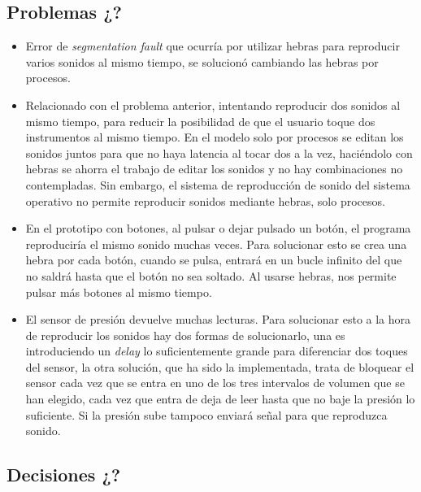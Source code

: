 \documentclass{article}
\begin{document}
 \subsection{Problemas ¿?}
 \begin{itemize}
     \item
        Error de \textit{segmentation fault} que ocurría por utilizar hebras para reproducir
        varios sonidos al mismo tiempo, se solucionó cambiando las hebras por procesos.
     \item
        Relacionado con el problema anterior, intentando reproducir dos sonidos al mismo tiempo, para reducir
        la posibilidad de que el usuario toque dos instrumentos al mismo tiempo. En el modelo solo por procesos
        se editan los sonidos juntos para que no haya latencia al tocar dos a la vez, haciéndolo con hebras se
        ahorra el trabajo de editar los sonidos y no hay combinaciones no contempladas. Sin embargo, el sistema
        de reproducción de sonido del sistema operativo no permite reproducir sonidos mediante hebras, solo
        procesos.
     \item
        En el prototipo con botones, al pulsar o dejar pulsado un botón, el programa reproduciría el mismo
        sonido muchas veces. Para solucionar esto se crea una hebra por cada botón, cuando se pulsa, entrará
        en un bucle infinito del que no saldrá hasta que el botón no sea soltado. Al usarse hebras, nos
        permite pulsar más botones al mismo tiempo.
     \item
        El sensor de presión devuelve muchas lecturas. Para solucionar esto a la hora de reproducir los sonidos
        hay dos formas de solucionarlo, una es introduciendo un \textit{delay} lo suficientemente grande para
        diferenciar dos toques del sensor, la otra solución, que ha sido la implementada, trata de bloquear el
        sensor cada vez que se entra en uno de los tres intervalos de volumen que se han elegido, cada vez que
        entra de deja de leer hasta que no baje la presión lo suficiente. Si la presión sube tampoco enviará
        señal para que reproduzca sonido.
 \end{itemize}

 \subsection{Decisiones ¿?}
\end{document}
